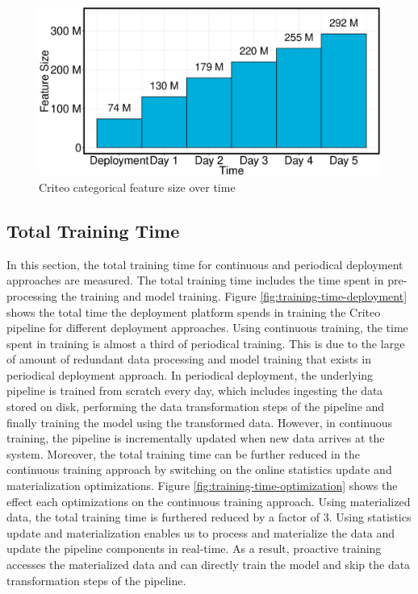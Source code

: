 \begin{figure}[H]
\includegraphics[width=\columnwidth]{../images/experiment-results/criteo-feature-discovery-experiment.eps}
\caption{Criteo categorical feature size over time}
\label{fig:criteo-feature-discovery}
\end{figure}



\subsection{Total Training Time}
In this section, the total training time for continuous and periodical deployment approaches are measured.
The total training time includes the time spent in pre-processing the training and model training.
Figure \ref{fig:training-time-deployment} shows the total time the deployment platform spends in training the Criteo pipeline for different deployment approaches.
Using continuous training, the time spent in training is almost a third of periodical training.
This is due to the large of amount of redundant data processing and model training that exists in periodical deployment approach.
In periodical deployment, the underlying pipeline is trained from scratch every day, which includes ingesting the data stored on disk, performing the data transformation steps of the pipeline and finally training the model using the transformed data.
However, in continuous training, the pipeline is incrementally updated when new data arrives at the system.
Moreover, the total training time can be further reduced in the continuous training approach by switching on the online statistics update and materialization optimizations.
Figure \ref{fig:training-time-optimization} shows the effect each optimizations on the continuous training approach.
Using materialized data, the total training time is furthered reduced by a factor of 3.
Using statistics update and materialization enables us to process and materialize the data and update the pipeline components in real-time.
As a result, proactive training accesses the materialized data and can directly train the model and skip the data transformation steps of the pipeline.

